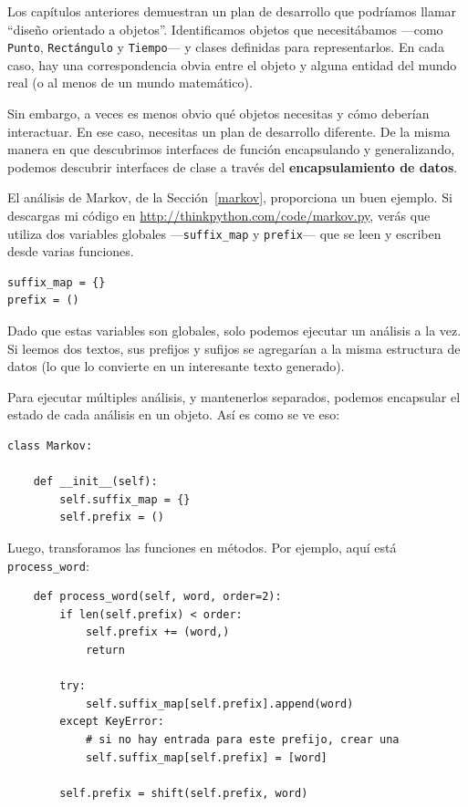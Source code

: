 \documentclass[10pt]{book}
\begin{document}
Los capítulos anteriores demuestran un plan de desarrollo que podríamos llamar
``diseño orientado a objetos''.  Identificamos objetos que necesitábamos ---como
{\tt Punto}, {\tt Rectángulo} y {\tt Tiempo}--- y clases definidas para
representarlos.  En cada caso, hay una correspondencia obvia
entre el objeto y alguna entidad del mundo real (o al menos de un
mundo matemático).

Sin embargo, a veces es menos obvio qué objetos necesitas
y cómo deberían interactuar.  En ese caso, necesitas un plan de desarrollo
diferente.  De la misma manera en que descubrimos interfaces
de función encapsulando y generalizando, podemos descubrir
interfaces de clase a través del {\bf encapsulamiento de datos}.

El análisis de Markov, de la Sección~\ref{markov}, proporciona un buen ejemplo.
Si descargas mi código en \url{http://thinkpython.com/code/markov.py},
verás que utiliza dos variables globales ---\verb"suffix_map" y
\verb"prefix"--- que se leen y escriben desde varias funciones.

\begin{verbatim}
suffix_map = {}
prefix = ()
\end{verbatim}

Dado que estas variables son globales, solo podemos ejecutar un análisis a la
vez.  Si leemos dos textos, sus prefijos y sufijos se
agregarían a la misma estructura de datos (lo que lo convierte en un interesante
texto generado).

Para ejecutar múltiples análisis, y mantenerlos separados, podemos encapsular
el estado de cada análisis en un objeto.
Así es como se ve eso:

\begin{verbatim}
class Markov:

    def __init__(self):
        self.suffix_map = {}
        self.prefix = ()
\end{verbatim}

Luego, transforamos las funciones en métodos.  Por ejemplo,
aquí está \verb"process_word":

\begin{verbatim}
    def process_word(self, word, order=2):
        if len(self.prefix) < order:
            self.prefix += (word,)
            return

        try:
            self.suffix_map[self.prefix].append(word)
        except KeyError:
            # si no hay entrada para este prefijo, crear una
            self.suffix_map[self.prefix] = [word]

        self.prefix = shift(self.prefix, word)
\end{verbatim}
\end{document}
